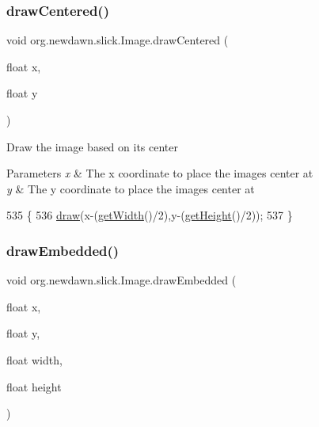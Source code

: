 \mbox{\label{classorg_1_1newdawn_1_1slick_1_1_image_a4edd600dd696e709937dad16ced8c9b9}} 
\subsubsection{\texorpdfstring{draw\+Centered()}{drawCentered()}}
{\footnotesize\ttfamily void org.\+newdawn.\+slick.\+Image.\+draw\+Centered (\begin{DoxyParamCaption}\item[{float}]{x,  }\item[{float}]{y }\end{DoxyParamCaption})\hspace{0.3cm}{\ttfamily [inline]}}

Draw the image based on it\textquotesingle{}s center


\begin{DoxyParams}{Parameters}
{\em x} & The x coordinate to place the image\textquotesingle{}s center at \\
\hline
{\em y} & The y coordinate to place the image\textquotesingle{}s center at \\
\hline
\end{DoxyParams}

\begin{DoxyCode}
535                                                \{
536         \mbox{\hyperlink{classorg_1_1newdawn_1_1slick_1_1_image_a9bddcca05c7140ab45df8ac5b250b6cd}{draw}}(x-(\mbox{\hyperlink{classorg_1_1newdawn_1_1slick_1_1_image_a94a5d32276e8a27930480223c5d69e11}{getWidth}}()/2),y-(\mbox{\hyperlink{classorg_1_1newdawn_1_1slick_1_1_image_aa2594a93f5126f60ad8a72444fceee98}{getHeight}}()/2));
537     \}
\end{DoxyCode}
\mbox{\label{classorg_1_1newdawn_1_1slick_1_1_image_a5a8910fb31d9350d0c70fe7717172034}} 
\subsubsection{\texorpdfstring{draw\+Embedded()}{drawEmbedded()}\hspace{0.1cm}{\footnotesize\ttfamily [1/3]}}
{\footnotesize\ttfamily void org.\+newdawn.\+slick.\+Image.\+draw\+Embedded (\begin{DoxyParamCaption}\item[{float}]{x,  }\item[{float}]{y,  }\item[{float}]{width,  }\item[{float}]{height }\end{DoxyParamCaption})\hspace{0.3cm}{\ttfamily [inline]}}

